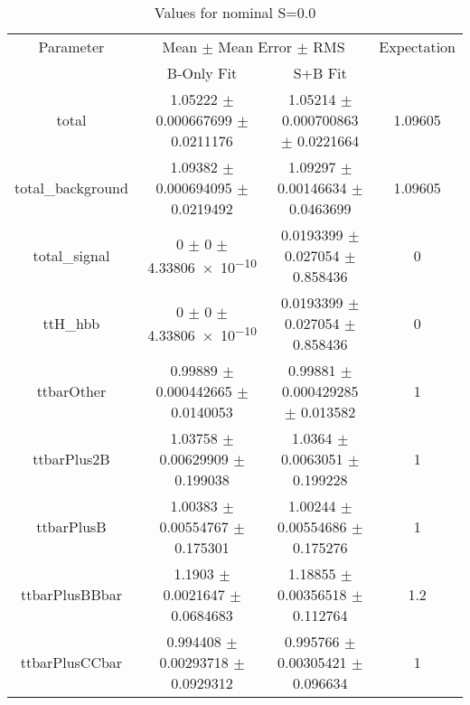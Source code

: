 \begin{table}
\centering
\caption{Values for nominal S=0.0}
\begin{tabular}{cccc}
\toprule
Parameter & \multicolumn{2}{c}{Mean $\pm$ Mean Error $\pm$ RMS} & Expectation\\
 & B-Only Fit & S+B Fit & \\
\midrule
total & \num{1.05222} $\pm$ \num{0.000667699} $\pm$ \num{0.0211176} & \num{1.05214} $\pm$ \num{0.000700863} $\pm$ \num{0.0221664} & \num{1.09605}\\
total\_background & \num{1.09382} $\pm$ \num{0.000694095} $\pm$ \num{0.0219492} & \num{1.09297} $\pm$ \num{0.00146634} $\pm$ \num{0.0463699} & \num{1.09605}\\
total\_signal & \num{0} $\pm$ \num{0} $\pm$ \num{4.33806e-10} & \num{0.0193399} $\pm$ \num{0.027054} $\pm$ \num{0.858436} & \num{0}\\
ttH\_hbb & \num{0} $\pm$ \num{0} $\pm$ \num{4.33806e-10} & \num{0.0193399} $\pm$ \num{0.027054} $\pm$ \num{0.858436} & \num{0}\\
ttbarOther & \num{0.99889} $\pm$ \num{0.000442665} $\pm$ \num{0.0140053} & \num{0.99881} $\pm$ \num{0.000429285} $\pm$ \num{0.013582} & \num{1}\\
ttbarPlus2B & \num{1.03758} $\pm$ \num{0.00629909} $\pm$ \num{0.199038} & \num{1.0364} $\pm$ \num{0.0063051} $\pm$ \num{0.199228} & \num{1}\\
ttbarPlusB & \num{1.00383} $\pm$ \num{0.00554767} $\pm$ \num{0.175301} & \num{1.00244} $\pm$ \num{0.00554686} $\pm$ \num{0.175276} & \num{1}\\
ttbarPlusBBbar & \num{1.1903} $\pm$ \num{0.0021647} $\pm$ \num{0.0684683} & \num{1.18855} $\pm$ \num{0.00356518} $\pm$ \num{0.112764} & \num{1.2}\\
ttbarPlusCCbar & \num{0.994408} $\pm$ \num{0.00293718} $\pm$ \num{0.0929312} & \num{0.995766} $\pm$ \num{0.00305421} $\pm$ \num{0.096634} & \num{1}\\
\bottomrule
\end{tabular}
\end{table}